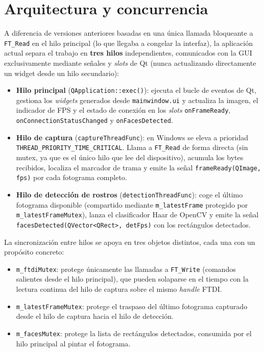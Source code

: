 \documentclass[../main.tex]{subfiles}
\begin{document}
\section{Arquitectura y concurrencia}
\label{sec:arquitectura_sw}

A diferencia de versiones anteriores basadas en una única llamada bloqueante a \texttt{FT\_Read} en el hilo principal (lo que llegaba a congelar la interfaz), la aplicación actual separa el trabajo en \textbf{tres hilos} independientes, comunicados con la \ac{GUI} exclusivamente mediante señales y \textit{slots} de Qt (nunca actualizando directamente un widget desde un hilo secundario):

\begin{itemize}
    \item \textbf{Hilo principal} (\texttt{QApplication::exec()}): ejecuta el bucle de eventos de Qt, gestiona los \textit{widgets} generados desde \texttt{mainwindow.ui} y actualiza la imagen, el indicador de FPS y el estado de conexión en los \textit{slots} \texttt{onFrameReady}, \texttt{onConnectionStatusChanged} y \texttt{onFacesDetected}.
    \item \textbf{Hilo de captura} (\texttt{captureThreadFunc}): en Windows se eleva a prioridad \texttt{THREAD\_PRIORITY\_TIME\_CRITICAL}. Llama a \texttt{FT\_Read} de forma directa (sin mutex, ya que es el único hilo que lee del dispositivo), acumula los bytes recibidos, localiza el marcador de trama y emite la señal \texttt{frameReady(QImage, fps)} por cada fotograma completo.
    \item \textbf{Hilo de detección de rostros} (\texttt{detectionThreadFunc}): coge el último fotograma disponible (compartido mediante \texttt{m\_latestFrame} protegido por \texttt{m\_latestFrameMutex}), lanza el clasificador Haar de OpenCV y emite la señal \texttt{facesDetected(QVector<QRect>, detFps)} con los rectángulos detectados.
\end{itemize}

La sincronización entre hilos se apoya en tres objetos distintos, cada una con un propósito concreto:
\begin{itemize}
    \item \texttt{m\_ftdiMutex}: protege únicamente las llamadas a \texttt{FT\_Write} (comandos salientes desde el hilo principal), que pueden solaparse en el tiempo con la lectura continua del hilo de captura sobre el mismo \textit{handle} FTDI.
    \item \texttt{m\_latestFrameMutex}: protege el traspaso del último fotograma capturado desde el hilo de captura hacia el hilo de detección.
    \item \texttt{m\_facesMutex}: protege la lista de rectángulos detectados, consumida por el hilo principal al pintar el fotograma.
\end{itemize}
\end{document}
